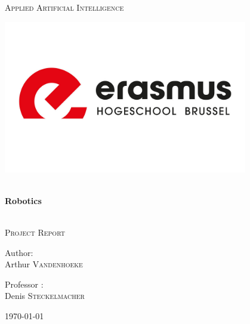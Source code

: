 \begin{titlepage}
\begin{center}


\textsc{\LARGE Applied Artificial Intelligence}

\includegraphics[width=0.8\textwidth]{Images/ehb_logo.jpg}

\HRule \\[0.3cm]
{ \huge \bfseries Robotics \\[0.4cm] }

\HRule \\[1cm]

\textsc{\Large Project Report }\\[1cm]

\noindent
\begin{minipage}{0.6\textwidth}
\begin{center} 
\Large Author: \\
\Large Arthur \textsc{Vandenhoeke}\\
\end{center}
\end{minipage}

\vspace{1cm}

\begin{minipage}{0.6\textwidth}
\begin{center} 
\Large Professor : \\
\Large Denis \textsc{Steckelmacher}\\
\end{center}
\end{minipage}

\vfill

{\large \today}

\end{center}
\end{titlepage}
